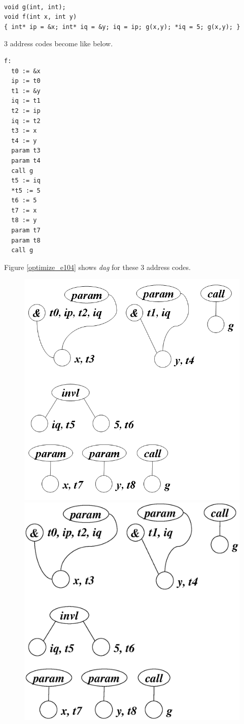 \begin{Example}
\label{optimize_e103}
\begin{verbatim}

void g(int, int);
void f(int x, int y)
{ int* ip = &x; int* iq = &y; iq = ip; g(x,y); *iq = 5; g(x,y); }
\end{verbatim}
3 address codes become like below.
\begin{verbatim}
f:
  t0 := &x
  ip := t0
  t1 := &y
  iq := t1
  t2 := ip
  iq := t2
  t3 := x
  t4 := y
  param t3
  param t4
  call g
  t5 := iq
  *t5 := 5
  t6 := 5
  t7 := x
  t8 := y
  param t7
  param t8
  call g
\end{verbatim}
Figure \ref{optimize_e104} shows {\em dag} for these 3 address codes.
\begin{figure}[htbp]
\begin{center}
\begin{htmlonly}
\includegraphics[width=0.788\linewidth,height=0.8\linewidth]{opt045.png}
\end{htmlonly}
\begin{latexonly}
\includegraphics[width=0.788\linewidth,height=0.8\linewidth]{opt045.eps}

\end{latexonly}
\end{center}
\end{figure}
\end{Example}

